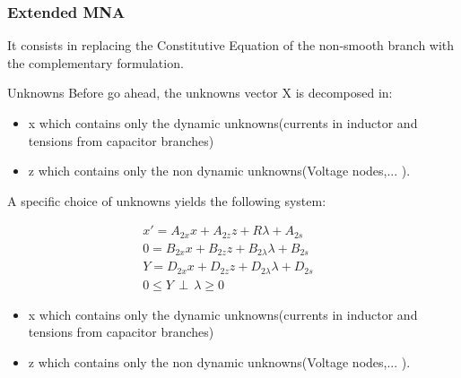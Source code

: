 
\frame
{
\frametitle{Extended MNA}
 It consists in replacing the Constitutive Equation of the non-smooth branch with the complementary
 formulation.

 \begin{block}{Unknowns}
 Before go ahead, the unknowns vector X is decomposed in:
\begin{itemize}
\item x which contains only the dynamic unknowns(currents in inductor and tensions from capacitor branches)
\item z which contains only the non dynamic unknowns(Voltage nodes,... ).
\end{itemize}
  \end{block}
  
 \begin{block}{A specific choice of unknowns yields the following system:}
 
 \begin{eqnarray}
x'=A_{2x}x +A_{2z}z +R \lambda +A_{2s}&\label{eq2}\\
0=B_{2x}x+B_{2z}z + B_{2\lambda}\lambda + B_{2s}&\label{eq3}\\
Y=D_{2x}x+D_{2z}z+D_{2\lambda}\lambda + D_{2s} &\label{eq4}\\
0 \leq Y \, \perp \, \lambda \geq 0&\label{eqperp}
\end{eqnarray}
\begin{itemize}
\item x which contains only the dynamic unknowns(currents in inductor and tensions from capacitor branches)
\item z which contains only the non dynamic unknowns(Voltage nodes,... ).
\end{itemize}

  \end{block}


}

